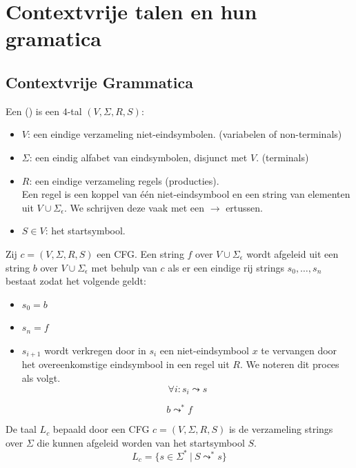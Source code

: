 \documentclass[main.tex]{subfiles}
\begin{document}
\chapter{Contextvrije talen en hun gramatica}
\label{cha:contextvrije-talen}

\section{Contextvrije Grammatica}
\label{sec:contextvrije-grammatica}


\begin{de}
  Een  () is een $4$-tal $(V,\Sigma,R,S)$:
  \begin{itemize}
  \item $V$: een eindige verzameling niet-eindsymbolen. (variabelen of non-terminals)
  \item $\Sigma$: een eindig alfabet van eindsymbolen, disjunct met $V$. (terminals)
  \item $R$: een eindige verzameling regels (producties).\\
    Een regel is een koppel van \'e\'en niet-eindsymbool en een string van elementen uit $V \cup \Sigma_{\epsilon}$. We schrijven deze vaak met een $\rightarrow$ ertussen.
  \item $S\in V$: het startsymbool.
  \end{itemize}
\end{de}

\begin{de}
  Zij $c = (V,\Sigma,R,S)$ een CFG.
  Een string $f$ over $V \cup \Sigma_{\epsilon}$ wordt afgeleid uit een string $b$ over $V \cup \Sigma_{\epsilon}$ met behulp van $c$ als er een eindige rij strings $s_{0},\dotsc,s_{n}$ bestaat zodat het volgende geldt:
  \begin{itemize}
  \item $s_{0} = b$
  \item $s_{n} = f$
  \item $s_{i+1}$ wordt verkregen door in $s_{i}$ een niet-eindsymbool $x$ te vervangen door het overeenkomstige eindsymbool in een regel uit $R$.
    We noteren dit proces als volgt.
    \[ \forall i: s_{i} \leadsto s \]
  \end{itemize}
  \[ b \leadsto^{*} f \]
\end{de}

\begin{de}
  De taal $L_{c}$ bepaald door een CFG $c = (V,\Sigma,R,S)$ is de verzameling strings over $\Sigma$ die kunnen afgeleid worden van het startsymbool $S$.
  \[ L_{c} = \{ s \in \Sigma^{*}\ |\ S \leadsto^{*} s \} \]
\end{de}
\end{document}
